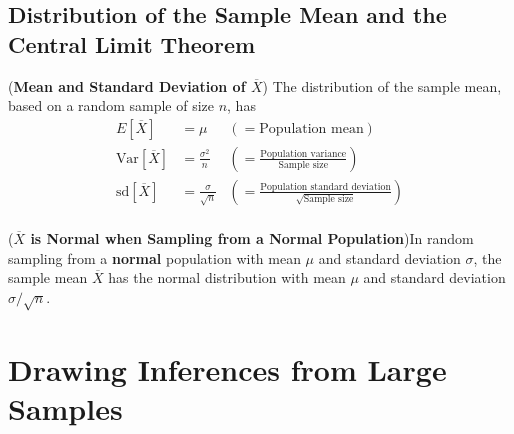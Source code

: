 \documentclass[12pt,a4paper]{article}
\newcommand{\Var}{\text{Var}}
\newcommand{\sd}{\text{sd}}
\begin{document}
\subsection{Distribution of the Sample Mean and the Central Limit Theorem}

\begin{tcolorbox}[colback=white]
	(\textbf{Mean and Standard Deviation of $\overline{X}$}) The distribution of the sample mean, based on a random sample of size $n$, has \begin{align*}
	E[\overline{X}] &=\mu&(=\text{Population mean}) \\
	\Var[\overline{X}] &=\frac{\sigma^2}{n}&\left(=\frac{\text{Population variance}}{\text{Sample size}}\right) \\
	\sd[\overline{X}] &=\frac{\sigma}{\sqrt{n}}&\left(=\frac{\text{Population standard deviation}}{\sqrt{\text{Sample size}}}\right) \\
	\end{align*}
\end{tcolorbox}

\begin{tcolorbox}[colback=white]
	(\textbf{$\overline{X}$ is Normal when Sampling from a Normal Population})\quad In random sampling from a \textbf{normal} population with mean $\mu$ and standard deviation $\sigma$, the sample mean $\overline{X}$ has the normal distribution with mean $\mu$ and standard deviation $\sigma/\sqrt{n}$.
\end{tcolorbox}

\newpage
\section{Drawing Inferences from Large Samples}
\end{document}
